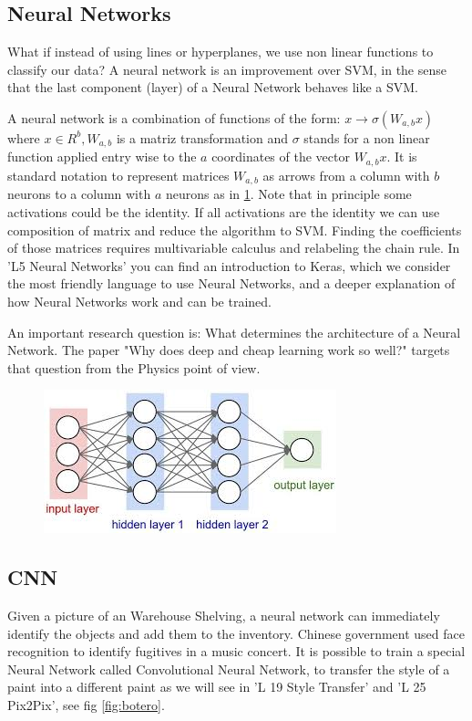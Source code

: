 \documentclass[11pt,letterpaper]{report}
\begin{document}
	\subsection{Neural Networks}  
	
	What if instead of using lines or hyperplanes, we use non linear functions to classify our data? A neural network is an improvement over SVM, in the sense that the last component (layer) of a Neural Network behaves like a SVM.
	
	 A neural network is a combination of  functions of the form:
	$x\rightarrow \sigma(W_{a,b}x)$ where $x\in R^b,  W_{a,b}$ is a matriz transformation and $\sigma$ stands for a non linear function applied entry wise to the $a$ coordinates of the vector  $W_{a,b}x.$
	It is standard notation to represent matrices  $W_{a,b}$ as arrows from a column with $b$ neurons to a column with $a$ neurons as in \ref{fig:nn}. Note that in principle some activations could be the identity. If all activations are the identity we can use composition of matrix and reduce the algorithm to SVM. Finding the coefficients of those matrices requires multivariable calculus and relabeling the chain rule. In 'L5 Neural Networks' you can find an introduction to Keras, which we consider the most friendly language to use Neural Networks, and a deeper explanation of how Neural Networks work and can be trained.	
	
	An important research question is: What determines the architecture of a Neural Network.  The paper "Why does deep and cheap learning work so well?" targets that question from the Physics point of view.
	
    	\begin{figure}[h!]
    	\centering
    	\includegraphics[width=0.45\linewidth]{figures/nn.jpg}
    	\caption{}
    	\label{fig:nn}
    \end{figure} 	

	\subsection{CNN}
	
	Given a picture of an Warehouse Shelving, a  neural network can immediately identify the objects and add them to the inventory. Chinese government used face recognition to identify fugitives in a music concert. It is possible to train a special Neural Network called Convolutional Neural Network, to transfer the style of a paint into a different paint as we will see in 'L 19 Style Transfer' and 'L 25 Pix2Pix', see fig \ref{fig:botero}. 
	
\end{document}
